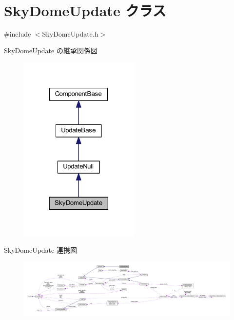 \hypertarget{class_sky_dome_update}{}\section{Sky\+Dome\+Update クラス}
\label{class_sky_dome_update}


{\ttfamily \#include $<$Sky\+Dome\+Update.\+h$>$}



Sky\+Dome\+Update の継承関係図\nopagebreak
\begin{figure}[H]
\begin{center}
\leavevmode
\includegraphics[width=170pt]{class_sky_dome_update__inherit__graph}
\end{center}
\end{figure}


Sky\+Dome\+Update 連携図\nopagebreak
\begin{figure}[H]
\begin{center}
\leavevmode
\includegraphics[width=350pt]{class_sky_dome_update__coll__graph}
\end{center}
\end{figure}
